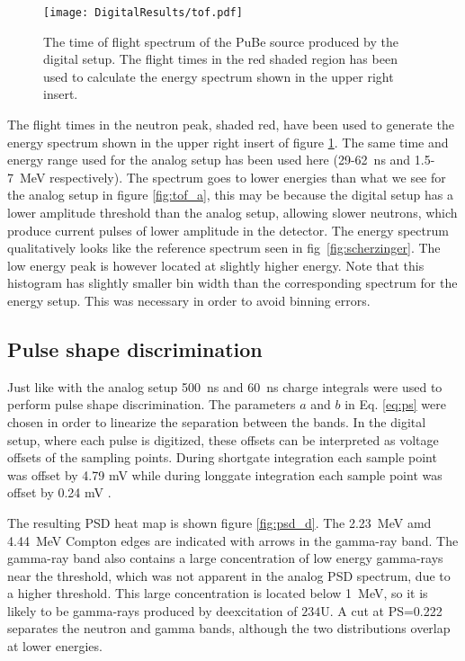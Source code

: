 \documentclass[main.tex]{subfiles}
\begin{document}
\begin{figure}[ht]
    \centering
        \texttt{[image: DigitalResults/tof.pdf]}
        \caption[Time of flight spectrum, digital setup.]{The time of flight spectrum of the PuBe source produced by the digital setup. The flight times in the red shaded region has been used to calculate the energy spectrum shown in the upper right insert.}
    \label{fig:tof_d} 
\end{figure}

The flight times in the neutron peak, shaded red, have been used to generate the energy spectrum shown in the upper right insert of figure \ref{fig:tof_d}. The same time and energy range used for the analog setup has been used here (29-\SI{62}{\ns} and 1.5-\SI{7}{\MeV} respectively). The spectrum goes to lower energies than what we see for the analog setup in figure \ref{fig:tof_a}, this may be because the digital setup has a lower amplitude threshold than the analog setup, allowing slower neutrons, which produce current pulses of lower amplitude in the detector. The energy spectrum qualitatively looks like the reference spectrum seen in fig~\ref{fig:scherzinger}. The low energy peak is however located at slightly higher energy. Note that this histogram has slightly smaller bin width than the corresponding spectrum for the energy setup. This was necessary in order to avoid binning errors.

\subsection{Pulse shape discrimination}
Just like with the analog setup \SI{500}{ns} and \SI{60}{ns} charge integrals were used to perform pulse shape discrimination. The parameters $a$ and $b$ in Eq. \ref{eq:ps} were chosen in order to linearize the separation between the bands. In the digital setup, where each pulse is digitized, these offsets can be interpreted as voltage offsets of the sampling points. During shortgate integration each sample point was offset by 4.79 mV while during longgate integration each sample point was offset by 0.24 mV .

The resulting PSD heat map is shown figure \ref{fig:psd_d}. The \SI{2.23}{\MeV} amd \SI{4.44}{MeV} Compton edges are indicated with arrows in the gamma-ray band. The gamma-ray band also contains a large concentration of low energy gamma-rays near the threshold, which was not apparent in the analog PSD spectrum, due to a higher threshold. This large concentration is located below \SI{1}{MeV}, so it is likely to be gamma-rays produced by deexcitation of $\text{234}$U.
A cut at PS=0.222 separates the neutron and gamma bands, although the two distributions overlap at lower energies.
\end{document}

